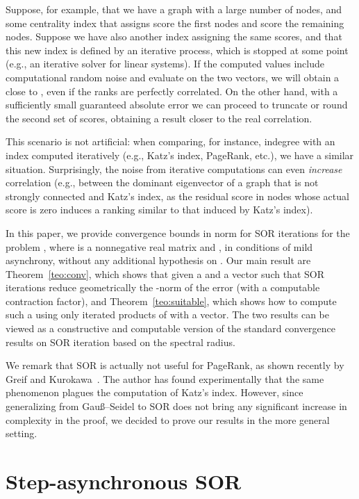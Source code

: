 \documentclass{article}
\newcommand{\Gauss}{Gau\ss}
\newcommand{\1}{\mathbf 1}
\begin{document}
Suppose, for example, that we have a
graph with a large number  of nodes, and some centrality index that assigns score  the first
 nodes and score  the remaining nodes. Suppose we have also another
index assigning the same scores, and that this new index is defined
by an iterative process, which is stopped at some point (e.g., an iterative
solver for linear systems). If the computed values
include computational random noise and evaluate  on the two
vectors, we will obtain a  close to , even if the ranks are
perfectly correlated. On the other hand, with a sufficiently small guaranteed
absolute error we can proceed to truncate or round the second set of scores, obtaining
a result closer to the real correlation.

This scenario is not artificial: when comparing, for instance, indegree
with an index computed iteratively (e.g., Katz's index, PageRank, etc.), we have
a similar situation. Surprisingly, the noise from iterative computations can
even \emph{increase} correlation (e.g., between the dominant eigenvector of a graph
that is not strongly connected and Katz's index, as the residual score in nodes
whose actual score is zero induces a ranking similar to that induced by
Katz's index).

In this paper, we provide convergence bounds in  norm for SOR iterations for
the problem , where  is a nonnegative real matrix
and , in conditions of mild asynchrony, without any
additional hypothesis on . Our main result are Theorem~\ref{teo:conv}, which shows 
that given a  and a vector  such that 
SOR iterations reduce geometrically the -norm of the error (with a
computable contraction factor), and Theorem~\ref{teo:suitable}, which shows how
to compute such a  using only iterated products of  with a vector. The
two results can be viewed as a constructive and computable version of the 
standard convergence results on SOR iteration based on the spectral radius.

We remark that SOR is actually not useful for PageRank, as shown recently by
Greif and Kurokawa~\cite{GrKNCSPP}. The author has found experimentally that the
same phenomenon plagues the computation of Katz's index. However, since
generalizing from \Gauss--Seidel to SOR does not bring any significant increase
in complexity in the proof, we decided to prove our results in the more general
setting.

\section{Step-asynchronous SOR}
\label{sec:SOR}
\end{document}
